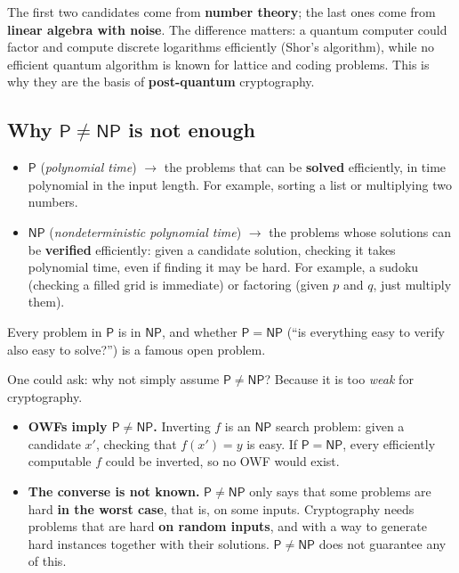 The first two candidates come from \textbf{number theory}; the last ones come from \textbf{linear algebra with noise}. The difference matters: a quantum computer could factor and compute discrete logarithms efficiently (Shor's algorithm), while no efficient quantum algorithm is known for lattice and coding problems. This is why they are the basis of \textbf{post-quantum} cryptography.

\subsection{Why $\mathsf{P} \neq \mathsf{NP}$ is not enough}

\begin{itemize}
  \item \textbf{$\mathsf{P}$} (\textit{polynomial time}) $\to$ the problems that can be \textbf{solved} efficiently, in time polynomial in the input length. For example, sorting a list or multiplying two numbers.
  \item \textbf{$\mathsf{NP}$} (\textit{nondeterministic polynomial time}) $\to$ the problems whose solutions can be \textbf{verified} efficiently: given a candidate solution, checking it takes polynomial time, even if finding it may be hard. For example, a sudoku (checking a filled grid is immediate) or factoring (given $p$ and $q$, just multiply them).
\end{itemize}
Every problem in $\mathsf{P}$ is in $\mathsf{NP}$, and whether $\mathsf{P} = \mathsf{NP}$ (``is everything easy to verify also easy to solve?'') is a famous open problem.

One could ask: why not simply assume $\mathsf{P} \neq \mathsf{NP}$? Because it is too \textit{weak} for cryptography.
\begin{itemize}
  \item \textbf{OWFs imply $\mathsf{P} \neq \mathsf{NP}$.} Inverting $f$ is an $\mathsf{NP}$ search problem: given a candidate $x'$, checking that $f(x') = y$ is easy. If $\mathsf{P} = \mathsf{NP}$, every efficiently computable $f$ could be inverted, so no OWF would exist.
  \item \textbf{The converse is not known.} $\mathsf{P} \neq \mathsf{NP}$ only says that some problems are hard \textbf{in the worst case}, that is, on some inputs. Cryptography needs problems that are hard \textbf{on random inputs}, and with a way to generate hard instances together with their solutions. $\mathsf{P} \neq \mathsf{NP}$ does not guarantee any of this.
\end{itemize}

